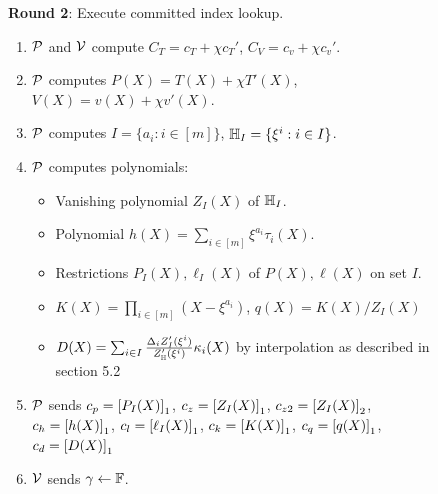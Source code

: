 \begin{figure}[t!]
\begin{mdframed}
        {\bf Round 2}: Execute committed index lookup.
        \begin{enumerate}[leftmargin=1em, label=\arabic*.]
            \item $\mathcal{P}$ and $\mathcal{V}$ compute $C_T=c_T + \chi c_T'$, $C_V=c_v + \chi c_v'$.
            \item $\mathcal{P}$ computes $P(X) = T(X) + \chi T'(X)$, $V(X)=v(X) + \chi v'(X)$.
            \item $\mathcal{P}$ computes $I=\{a_i: i\in [m]\}$, $\mathbb{H}_I=\{\xi^i: i\in I\}$.
            \item $\mathcal{P}$ computes polynomials:
            \begin{itemize}[leftmargin=1em, label=-]
                \item Vanishing polynomial $Z_I(X)$ of $\mathbb{H}_I$.
                \item Polynomial $h(X)=\sum_{i\in [m]}\xi^{a_i}\tau_i(X)$.
                \item Restrictions $P_I(X),\ell_I(X)$ of $P(X),\ell(X)$ on set $I$.
                \item $K(X)=\prod_{i\in [m]}(X-\xi^{a_i})$, $q(X)=K(X)/Z_I(X)$
                \item $D(X)= \sum_{i\in I}\frac{\Delta_i Z_I'(\xi^i)}{Z_{\mathbb{H}}'(\xi^i)}\kappa_i(X)$ by interpolation as described in section 5.2
            \end{itemize}

            \item $\mathcal{P}$ sends $c_p = \left[{P_I(X)}\right]_1$, $c_z=\left[{Z_I(X)}\right]_1$, $c_{z2}=\left[{Z_I(X)}\right]_2$, $c_h=\left[{h(X)}\right]_1$, $c_l = \left[{\ell_I(X)}\right]_1$,
            $c_k = \left[{K(X)}\right]_1$, $c_q = \left[{q(X)}\right]_1$, $c_d=\left[{D(X)}\right]_1$
            \item $\mathcal{V}$ sends $\gamma\gets \mathbb{F}$.
        \end{enumerate}


\end{mdframed}
\end{figure}
